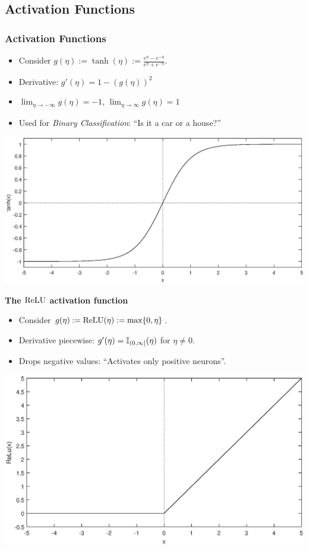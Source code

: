 \documentclass[10pt,hyperref={pdfpagelabels=false}]{beamer}
\begin{document}
\subsection{Activation Functions}
\begin{frame}[allowframebreaks]
    \frametitle{Activation Functions}

    \begin{itemize}
        \item Consider $g(\eta):=\tanh(\eta):= \frac{e^{\eta}-e^{-\eta}}{e^{\eta}+e^{-\eta}}$.
        \item Derivative: $g'(\eta) = 1-\left(g(\eta)\right)^2 $
        \item $\displaystyle\lim_{\eta\to-\infty} g(\eta) = -1$, $\displaystyle\lim_{\eta\to\infty} g(\eta) = 1$
        \item Used for \emph{Binary Classification}: ``Is it a car or a house?''
    \end{itemize}
    \includegraphics[width=.7\textwidth]{figures/tanh.eps}
    \framebreak

    {\large{\bf The $\operatorname{ReLU}$ activation function}}

    \begin{itemize}
        \item Consider $g(\eta):=\operatorname{ReLU}(\eta):= \max\{0, \eta\}$.
        \item Derivative piecewise: $g'(\eta) = \mathbb{I}_{(0, \infty]}(\eta)$ for $\eta\neq 0$.
        \item Drops negative values: ``Activates only positive neurons''.
    \end{itemize}
    \centering\includegraphics[width=.7\textwidth]{figures/relu.eps}
    \framebreak


\end{frame}
\end{document}
